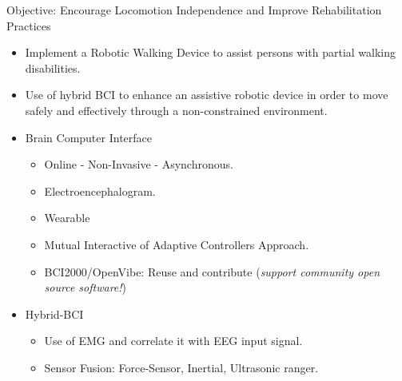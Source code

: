 \documentclass[final]{beamer}
\begin{document}
\begin{frame}
\begin{columns}
\begin{column}{.49\textwidth}
            \begin{block}{Objective: Encourage Locomotion Independence and Improve Rehabilitation Practices}
	      \begin{itemize}
                 
                  \item Implement a Robotic Walking Device to assist persons with partial walking disabilities.
                  \item Use of hybrid BCI to enhance an assistive robotic device in order to move safely and effectively through a non-constrained environment.
                 
                  \item Brain Computer Interface 
                
                  \begin{itemize}
                  \item Online - Non-Invasive - Asynchronous.
                  \item Electroencephalogram.
                  \item Wearable
                  \item Mutual Interactive of Adaptive Controllers Approach.
                  \item BCI2000/OpenVibe: Reuse and contribute (\textit{support community open source software!})
                  \end{itemize}
                 
                  \item Hybrid-BCI
                
                  \begin{itemize}
                  \item Use of EMG and correlate it with EEG input signal.
                  \item Sensor Fusion: Force-Sensor, Inertial, Ultrasonic ranger.
                  \end{itemize}

                  
	      \end{itemize}
            \end{block}
            \vfill


\end{column}
\end{columns}
\end{frame}
\end{document}
